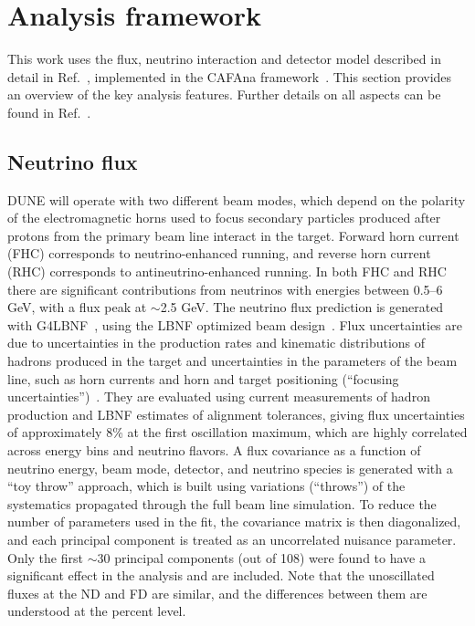 \section{Analysis framework}
\label{sec:analysis_framework}
This work uses the flux, neutrino interaction and detector model described in detail in Ref.~\cite{Abi:2020qib}, implemented in the CAFAna framework~\cite{CAFAna}. This section provides an overview of the key analysis features. Further details on all aspects can be found in Ref.~\cite{Abi:2020qib}.

\subsection{Neutrino flux}
DUNE will operate with two different beam modes, which depend on the polarity of the electromagnetic horns used to focus secondary particles produced after protons from the primary beam line interact in the target. Forward horn current (FHC) corresponds to neutrino-enhanced running, and reverse horn current (RHC) corresponds to antineutrino-enhanced running. In both FHC and RHC there are significant contributions from neutrinos with energies between 0.5--6 GeV, with a flux peak at $\sim$2.5 GeV. The neutrino flux prediction is generated with G4LBNF~\cite{Aliaga:2016oaz,Abi:2020evt}, using the LBNF optimized beam design~\cite{Abi:2020evt}. Flux uncertainties are due to uncertainties in the production rates and kinematic distributions of hadrons produced in the target and uncertainties in the parameters of the beam line, such as horn currents and horn and target positioning (``focusing uncertainties'')~\cite{Abi:2020evt}. They are evaluated using current measurements of hadron production and LBNF estimates of alignment tolerances, giving flux uncertainties of approximately 8\% at the first oscillation maximum, which are highly correlated across energy bins and neutrino flavors. A flux covariance as a function of neutrino energy, beam mode, detector, and neutrino species is generated with a ``toy throw'' approach, which is built using variations (``throws'') of the systematics propagated through the full beam line simulation. To reduce the number of parameters used in the fit, the covariance matrix is then diagonalized, and each principal component is treated as an uncorrelated nuisance parameter. Only the first $\sim$30 principal components (out of 108) were found to have a significant effect in the analysis and are included. Note that the unoscillated fluxes at the ND and FD are similar, and the differences between them are understood at the percent level.

